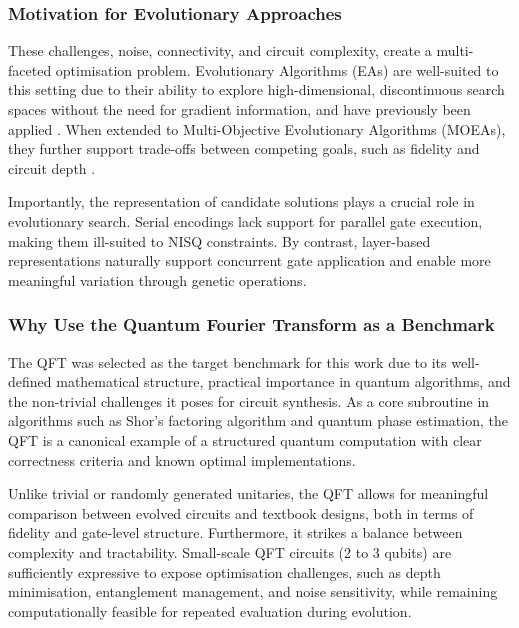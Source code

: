 \documentclass[11pt,a4paper]{article}
\begin{document}
\subsubsection*{Motivation for Evolutionary Approaches}
These challenges, noise, connectivity, and circuit complexity, create a multi-faceted optimisation problem. Evolutionary Algorithms (EAs) are well-suited to this setting due to their ability to explore high-dimensional, discontinuous search spaces without the need for gradient information, and have previously been applied \cite{Lukac2002EvolvingQC}. When extended to Multi-Objective Evolutionary Algorithms (MOEAs), they further support trade-offs between competing goals, such as fidelity and circuit depth \cite{moein, Zhou2011MultiobjectiveEA}.\newline

Importantly, the representation of candidate solutions plays a crucial role in evolutionary search. Serial encodings lack support for parallel gate execution, making them ill-suited to NISQ constraints. By contrast, layer-based representations naturally support concurrent gate application and enable more meaningful variation through genetic operations.

\subsubsection*{Why Use the Quantum Fourier Transform as a Benchmark}
The QFT \cite{Jozsa1997QuantumAA} was selected as the target benchmark for this work due to its well-defined mathematical structure, practical importance in quantum algorithms, and the non-trivial challenges it poses for circuit synthesis. As a core subroutine in algorithms such as Shor’s factoring algorithm and quantum phase estimation, the QFT is a canonical example of a structured quantum computation with clear correctness criteria and known optimal implementations.\newline

Unlike trivial or randomly generated unitaries, the QFT allows for meaningful comparison between evolved circuits and textbook designs, both in terms of fidelity and gate-level structure. Furthermore, it strikes a balance between complexity and tractability. Small-scale QFT circuits (2 to 3 qubits) are sufficiently expressive to expose optimisation challenges, such as depth minimisation, entanglement management, and noise sensitivity, while remaining computationally feasible for repeated evaluation during evolution.\newline
\end{document}
